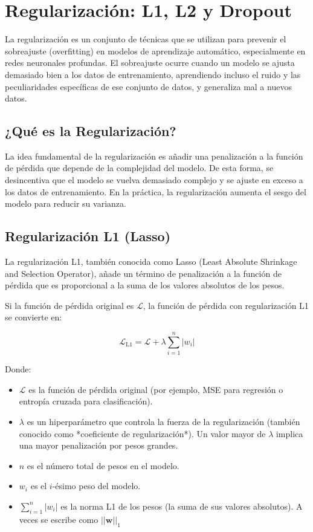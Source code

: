 \documentclass{article}
\begin{document}
\section{Regularización: L1, L2 y Dropout}

La regularización es un conjunto de técnicas que se utilizan para prevenir el sobreajuste (overfitting) en modelos de aprendizaje automático, especialmente en redes neuronales profundas.  El sobreajuste ocurre cuando un modelo se ajusta demasiado bien a los datos de entrenamiento, aprendiendo incluso el ruido y las peculiaridades específicas de ese conjunto de datos, y generaliza mal a nuevos datos.

\subsection{¿Qué es la Regularización?}

La idea fundamental de la regularización es añadir una penalización a la función de pérdida que depende de la complejidad del modelo. De esta forma, se desincentiva que el modelo se vuelva demasiado complejo y se ajuste en exceso a los datos de entrenamiento. En la práctica, la regularización aumenta el sesgo del modelo para reducir su varianza.

\subsection{Regularización L1 (Lasso)}

La regularización L1, también conocida como Lasso (Least Absolute Shrinkage and Selection Operator), añade un término de penalización a la función de pérdida que es proporcional a la suma de los valores absolutos de los pesos.

Si la función de pérdida original es \(\mathcal{L}\), la función de pérdida con regularización L1 se convierte en:

\[
\mathcal{L}_{\text{L1}} = \mathcal{L} + \lambda \sum_{i=1}^{n} |w_i|
\]

Donde:

\begin{itemize}
    \item \(\mathcal{L}\) es la función de pérdida original (por ejemplo, MSE para regresión o entropía cruzada para clasificación).
    \item \(\lambda\) es un hiperparámetro que controla la fuerza de la regularización (también conocido como *coeficiente de regularización*). Un valor mayor de \(\lambda\) implica una mayor penalización por pesos grandes.
    \item \(n\) es el número total de pesos en el modelo.
    \item \(w_i\) es el \(i\)-ésimo peso del modelo.
    \item \(\sum_{i=1}^{n} |w_i|\) es la norma L1 de los pesos (la suma de sus valores absolutos).  A veces se escribe como  \(||\mathbf{w}||_1\)
\end{itemize}
\end{document}
